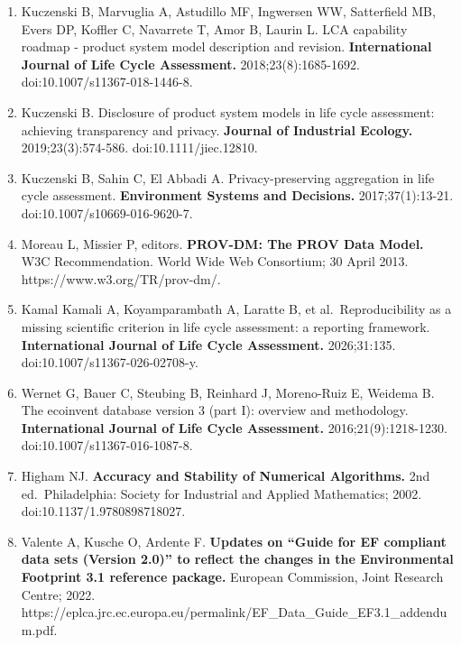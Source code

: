 \documentclass[
  10pt,
  a4paper,
  DIV=11,
  numbers=noendperiod]{scrartcl}
\begin{document}
\begin{enumerate}
  Bourgault G, Lesage P, Samson R. Systematic disaggregation: a hybrid
  LCI computation algorithm enhancing interpretation phase in LCA.
  \textbf{International Journal of Life Cycle Assessment.}
  2012;17(6):774-786. doi:10.1007/s11367-012-0418-7.
\item
  Kuczenski B, Marvuglia A, Astudillo MF, Ingwersen WW, Satterfield MB,
  Evers DP, Koffler C, Navarrete T, Amor B, Laurin L. LCA capability
  roadmap - product system model description and revision.
  \textbf{International Journal of Life Cycle Assessment.}
  2018;23(8):1685-1692. doi:10.1007/s11367-018-1446-8.
\item
  Kuczenski B. Disclosure of product system models in life cycle
  assessment: achieving transparency and privacy. \textbf{Journal of
  Industrial Ecology.} 2019;23(3):574-586. doi:10.1111/jiec.12810.
\item
  Kuczenski B, Sahin C, El Abbadi A. Privacy-preserving aggregation in
  life cycle assessment. \textbf{Environment Systems and Decisions.}
  2017;37(1):13-21. doi:10.1007/s10669-016-9620-7.
\item
  Moreau L, Missier P, editors. \textbf{PROV-DM: The PROV Data Model.}
  W3C Recommendation. World Wide Web Consortium; 30 April 2013.
  https://www.w3.org/TR/prov-dm/.
\item
  Kamal Kamali A, Koyamparambath A, Laratte B, et al.~Reproducibility as
  a missing scientific criterion in life cycle assessment: a reporting
  framework. \textbf{International Journal of Life Cycle Assessment.}
  2026;31:135. doi:10.1007/s11367-026-02708-y.
\item
  Wernet G, Bauer C, Steubing B, Reinhard J, Moreno-Ruiz E, Weidema B.
  The ecoinvent database version 3 (part I): overview and methodology.
  \textbf{International Journal of Life Cycle Assessment.}
  2016;21(9):1218-1230. doi:10.1007/s11367-016-1087-8.
\item
  Higham NJ. \textbf{Accuracy and Stability of Numerical Algorithms.}
  2nd ed.~Philadelphia: Society for Industrial and Applied Mathematics;
  2002. doi:10.1137/1.9780898718027.
\item
  Valente A, Kusche O, Ardente F. \textbf{Updates on ``Guide for EF
  compliant data sets (Version 2.0)'' to reflect the changes in the
  Environmental Footprint 3.1 reference package.} European Commission,
  Joint Research Centre; 2022.
  https://eplca.jrc.ec.europa.eu/permalink/EF\_Data\_Guide\_EF3.1\_addendum.pdf.
\end{enumerate}
\end{document}
